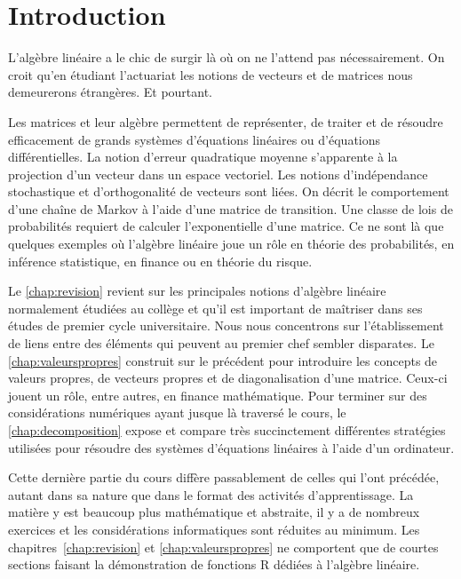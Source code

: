 \chapter*{Introduction}

L'algèbre linéaire a le chic de surgir là où on ne l'attend pas
nécessairement. On croit qu'en étudiant l'actuariat les notions de
vecteurs et de matrices nous demeurerons étrangères. Et pourtant.

Les matrices et leur algèbre permettent de représenter, de traiter et
de résoudre efficacement de grands systèmes d'équations linéaires ou
d'équations différentielles. La notion d'erreur quadratique moyenne
s'apparente à la projection d'un vecteur dans un espace vectoriel. Les
notions d'indépendance stochastique et d'orthogonalité de vecteurs
sont liées. On décrit le comportement d'une chaîne de Markov à l'aide
d'une matrice de transition. Une classe de lois de probabilités
requiert de calculer l'exponentielle d'une matrice. Ce ne sont là que
quelques exemples où l'algèbre linéaire joue un rôle en théorie des
probabilités, en inférence statistique, en finance ou en théorie du
risque.

Le \autoref{chap:revision} revient sur les principales notions
d'algèbre linéaire normalement étudiées au collège et qu'il est
important de maîtriser dans ses études de premier cycle universitaire.
Nous nous concentrons sur l'établissement de liens entre des éléments
qui peuvent au premier chef sembler disparates. Le
\autoref{chap:valeurspropres} construit sur le précédent pour
introduire les concepts de valeurs propres, de vecteurs propres et de
diagonalisation d'une matrice. Ceux-ci jouent un rôle, entre autres,
en finance mathématique. Pour terminer sur des considérations
numériques ayant jusque là traversé le cours, le
\autoref{chap:decomposition} expose et compare très succinctement
différentes stratégies utilisées pour résoudre des systèmes
d'équations linéaires à l'aide d'un ordinateur.

Cette dernière partie du cours diffère passablement de celles qui
l'ont précédée, autant dans sa nature que dans le format des activités
d'apprentissage. La matière y est beaucoup plus mathématique et
abstraite, il y a de nombreux exercices et les considérations
informatiques sont réduites au minimum. Les
chapitres~\ref{chap:revision} et \ref{chap:valeurspropres} ne
comportent que de courtes sections faisant la démonstration de
fonctions R dédiées à l'algèbre linéaire.

